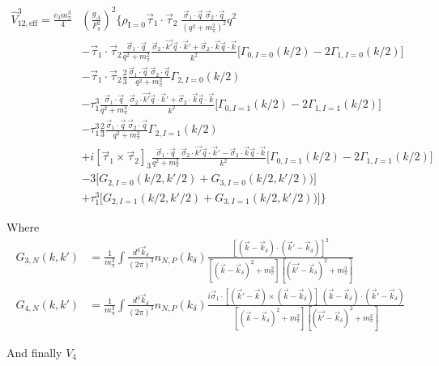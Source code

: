 \documentclass[%
 preprint,
 amsmath,amssymb,
 aps,
]{revtex4-1}
\newcommand{\veff}{\hat{V}_{12,\text{eff}}}
\newcommand{\rhozero}{\rho_{\text{I}=0}}
\newcommand{\taudot}{\vec{\tau}_1\cdot\vec{\tau}_2}
\newcommand{\taucrossthree}{\left[\vec{\tau}_1\times\vec{\tau}_2\right]_3}
\newcommand{\Gam}[3]{\Gamma_{#1, I=#2}\left(#3\right)}
\begin{document}
\begin{equation}\begin{split}
 \veff^3 = \frac{c_3 m_\pi^3}{4}& \left(\frac{g_A}{F_\pi^2}\right)^2
 \Bigg\{ \rhozero \taudot \; \frac{\vec{\sigma}_1\cdot\vec{q}\;\vec{\sigma}_2\cdot\vec{q}}{(q^2+m_\pi^2)^2}q^2 \\
& - \taudot \frac{\vec{\sigma}_1 \cdot \vec{q}}{q^2+m_\pi^2}\frac{\vec{\sigma}_2\cdot\vec{k'}\vec{q}\cdot\vec{k}'+\vec{\sigma}_2\cdot\vec{k}\vec{q}\cdot\vec{k}}{k^2}\Big[\Gam{0}{0}{k/2}-2\Gam{1}{0}{k/2}\Big] \\
& -\taudot\frac{2}{3}\frac{\vec{\sigma}_1 \cdot \vec{q}\;\vec{\sigma}_2 \cdot \vec{q}}{q^2+m_\pi^2}\Gam{2}{0}{k/2} \\
& - \tau_1^3 \frac{\vec{\sigma}_1 \cdot \vec{q}}{q^2+m_\pi^2}\frac{\vec{\sigma}_2\cdot\vec{k'}\vec{q}\cdot\vec{k}'+\vec{\sigma}_2\cdot\vec{k}\vec{q}\cdot\vec{k}}{k^2}\Big[\Gam{0}{1}{k/2}-2\Gam{1}{1}{k/2}\Big] \\
& -\tau_1^3\frac{2}{3}\frac{\vec{\sigma}_1 \cdot \vec{q}\;\vec{\sigma}_2 \cdot \vec{q}}{q^2+m_\pi^2}\Gam{2}{1}{k/2} \\
& + i\taucrossthree \frac{\vec{\sigma}_1 \cdot \vec{q}}{q^2+m_\pi^2}\frac{\vec{\sigma}_2\cdot\vec{k'}\vec{q}\cdot\vec{k}'-\vec{\sigma}_2\cdot\vec{k}\vec{q}\cdot\vec{k}}{k^2}\Big[\Gam{0}{1}{k/2}-2\Gam{1}{1}{k/2}\Big] \\
& -3 \Big[ G_{2,I=0}(k/2,k'/2)+G_{3,I=0}(k/2,k'/2)) \Big]\\
& +\tau_1^3\Big[ G_{2,I=1}(k/2,k'/2)+G_{3,I=1}(k/2,k'/2)) \Big]\Bigg\}
\end{split}
 \end{equation}
 
 Where
\begin{align}
G_{3,N}(k,k') & = \frac{1}{m_\pi^3}\int\frac{d^3\vec{k}_\delta}{(2\pi)^3} n_{N,P}(k_\delta) \frac{\left[(\vec{k}-\vec{k}_\delta)\cdot(\vec{k}'-\vec{k}_\delta) \right]^2}{[(\vec{k}-\vec{k}_\delta)^2+m_\pi^2][(\vec{k'}-\vec{k}_\delta)^2+m_\pi^2]} \\
%
G_{4,N}(k,k') & = \frac{1}{m_\pi^3}\int\frac{d^3\vec{k}_\delta}{(2\pi)^3} n_{N,P}(k_\delta) \frac{i\vec{\sigma}_1\cdot\left[(\vec{k}'-\vec{k})\times(\vec{k}-\vec{k}_\delta)\right]\;(\vec{k}-\vec{k}_\delta)\cdot(\vec{k}'-\vec{k}_\delta) }{[(\vec{k}-\vec{k}_\delta)^2+m_\pi^2][(\vec{k'}-\vec{k}_\delta)^2+m_\pi^2]}
\end{align}

 And finally $V_4$
 
\end{document}
